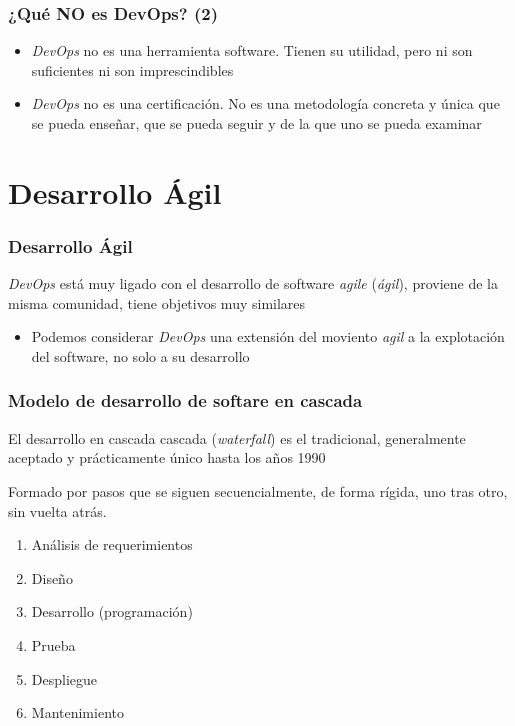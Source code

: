 \documentclass[ucs]{beamer}
\begin{document}
\begin{frame}[fragile]
\frametitle{¿Qué NO es DevOps? (2)}
\begin{itemize}
\item
\emph{DevOps}
no es una herramienta software.
Tienen su utilidad, pero ni son suficientes ni son imprescindibles

\item
\emph{DevOps}
no es una certificación. No es una metodología concreta y única que
se pueda enseñar, que se pueda seguir y de la que uno se pueda examinar

\end{itemize}
\end{frame}

\section{Desarrollo Ágil}
\begin{frame}[fragile]
\frametitle{Desarrollo Ágil}
\emph{DevOps}
está muy ligado con el desarrollo de software
\emph{agile}
(\emph{ágil}), proviene de la misma comunidad,
tiene objetivos muy similares

\begin{itemize}
\item
Podemos considerar
\emph{DevOps}
una extensión del moviento \emph{agil} a la explotación
del software, no solo a su desarrollo
\end{itemize}
\end{frame}



\begin{frame}[fragile]
\frametitle{Modelo de desarrollo de softare en cascada}

El desarrollo en cascada
cascada (\emph{waterfall}) es el tradicional, generalmente aceptado y prácticamente único hasta los
años 1990

Formado por pasos que se siguen secuencialmente, de forma rígida, uno tras otro, sin vuelta atrás.

    \begin{enumerate}
    \item
Análisis de requerimientos
    \item
Diseño
    \item
Desarrollo (programación)
    \item
Prueba
    \item
Despliegue
    \item
Mantenimiento
    \end{enumerate}
\end{frame}
\end{document}
